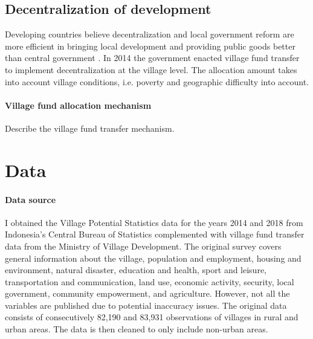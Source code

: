 \documentclass[letterpaper,12pt,leqno]{article}
\begin{document}
\subsection{Decentralization of development}\label{ss:decentral}

Developing countries believe decentralization and local government reform are more efficient in bringing local development \citep{vazquez_2017} and providing public goods better than central government \citep{arends2020}. In 2014 the government enacted village fund transfer to implement decentralization at the village level. The allocation amount takes into account village conditions, i.e. poverty and geographic difficulty into account.

\paragraph{Village fund allocation mechanism} Describe the village fund transfer mechanism.

\section{Data}\label{s:data}

\paragraph{Data source} I obtained the Village Potential Statistics data for the years 2014 and 2018 from Indonesia's Central Bureau of Statistics complemented with village fund transfer data from the Ministry of Village Development. The original survey covers general information about the village, population and employment, housing and environment, natural disaster, education and health, sport and leisure, transportation and communication, land use, economic activity, security, local government, community empowerment, and agriculture. However, not all the variables are published due to potential inaccuracy issues. The original data consists of consecutively 82,190 and 83,931 observations of villages in rural and urban areas. The data is then cleaned to only include non-urban areas.
\end{document}
